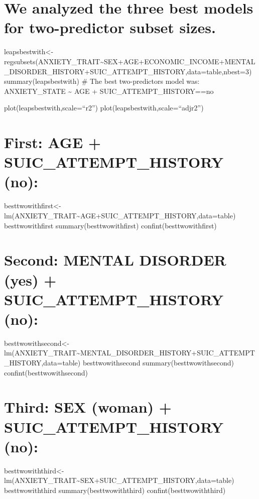 \documentclass[
]{book}
\begin{document}
\hypertarget{we-analyzed-the-three-best-models-for-two-predictor-subset-sizes.-2}{%
\chapter{We analyzed the three best models for two-predictor subset sizes.}\label{we-analyzed-the-three-best-models-for-two-predictor-subset-sizes.-2}}

leapsbestwith\textless-regsubsets(ANXIETY\_TRAIT\textasciitilde SEX+AGE+ECONOMIC\_INCOME+MENTAL\_DISORDER\_HISTORY+SUIC\_ATTEMPT\_HISTORY,data=table,nbest=3)
summary(leapsbestwith)
\# The best two-predictors model was: ANXIETY\_STATE \textasciitilde{} AGE + SUIC\_ATTEMPT\_HISTORY==no

plot(leapsbestwith,scale=``r2'')
plot(leapsbestwith,scale=``adjr2'')

\hypertarget{first-age-suic_attempt_history-no-2}{%
\chapter{First: AGE + SUIC\_ATTEMPT\_HISTORY (no):}\label{first-age-suic_attempt_history-no-2}}

besttwowithfirst\textless-lm(ANXIETY\_TRAIT\textasciitilde AGE+SUIC\_ATTEMPT\_HISTORY,data=table)
besttwowithfirst
summary(besttwowithfirst)
confint(besttwowithfirst)

\hypertarget{second-mental-disorder-yes-suic_attempt_history-no-1}{%
\chapter{Second: MENTAL DISORDER (yes) + SUIC\_ATTEMPT\_HISTORY (no):}\label{second-mental-disorder-yes-suic_attempt_history-no-1}}

besttwowithsecond\textless-lm(ANXIETY\_TRAIT\textasciitilde MENTAL\_DISORDER\_HISTORY+SUIC\_ATTEMPT\_HISTORY,data=table)
besttwowithsecond
summary(besttwowithsecond)
confint(besttwowithsecond)

\hypertarget{third-sex-woman-suic_attempt_history-no}{%
\chapter{Third: SEX (woman) + SUIC\_ATTEMPT\_HISTORY (no):}\label{third-sex-woman-suic_attempt_history-no}}

besttwowiththird\textless-lm(ANXIETY\_TRAIT\textasciitilde SEX+SUIC\_ATTEMPT\_HISTORY,data=table)
besttwowiththird
summary(besttwowiththird)
confint(besttwowiththird)
\end{document}

